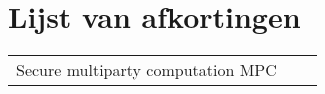 \chapter*{Lijst van afkortingen}
\begin{table}[!h]
	\begin{tabular}{cll}
		Secure multiparty computation MPC\\
	\end{tabular}
\end{table}
